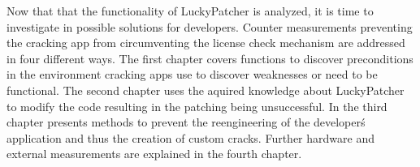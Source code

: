 Now that that the functionality of LuckyPatcher is analyzed, it is time to investigate in possible solutions for developers. Counter measurements preventing the cracking app from circumventing the license check mechanism are addressed in four different ways.\newline
The first chapter covers functions to discover preconditions in the environment cracking apps use to discover weaknesses or need to be functional. The second chapter uses the aquired knowledge about LuckyPatcher to modify the code resulting in the patching being unsuccessful. In the third chapter presents methods to prevent the reengineering of the developer\'s application and thus the creation of custom cracks. Further hardware and external measurements are explained in the fourth chapter.
